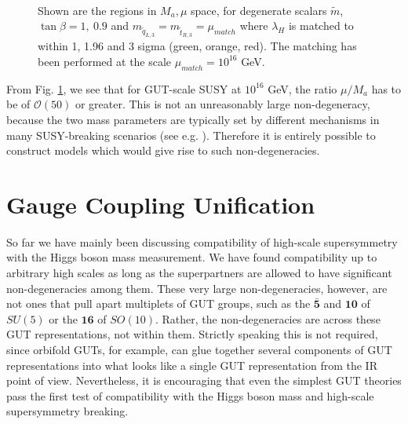 \documentclass[12pt]{article}
\newcommand{\Order}{\mathcal{O}}
\newcommand{\sq}{\tilde{q}}
\newcommand{\mStL}{m_{\sq_{L,3}}}
\newcommand{\mStR}{m_{\tilde{t}_{R,3}}}
\newcommand{\mS}{\tilde{m}}
\begin{document}
\begin{figure}[t]
\centering
{}~~
\caption{Shown are the regions in $M_a, \mu$ space, for degenerate scalars $\mS$, $\tan\beta=1,~0.9$ and $\mStL=\mStR=\mu_{match}$ where $\lambda_H$ is matched to within 1, 1.96 and 3 sigma (green, orange, red). The matching has been performed at the scale $\mu_{match}=10^{16}$ GeV.%
}
\label{16_contours.FIG}
\end{figure}

From Fig. \ref{16_contours.FIG}, we see that for GUT-scale SUSY at $10^{16}$ GeV, the ratio $\mu / M_a$ has to be of $\Order(50)$ or greater. This is not an unreasonably large non-degeneracy, because the two mass parameters are typically set by different mechanisms in many SUSY-breaking scenarios (see e.g. \cite{Giudice:1988yz, Witten:2001bf, Acharya:2006ia, Raby:2017ucc}). Therefore it is entirely possible to construct models which would give rise to such non-degeneracies.



\section{Gauge Coupling Unification}
\label{GCU.SEC}

So far we have mainly been discussing compatibility of high-scale supersymmetry with the Higgs boson mass measurement. We have found compatibility up to arbitrary high scales as long as the superpartners are allowed to have significant non-degeneracies among them. These very large non-degeneracies, however, are not ones that pull apart multiplets of GUT groups, such as the $\bar {\mathbf{5}}$ and $\mathbf{10}$ of $SU(5)$ or the $\mathbf{16}$ of $SO(10)$. Rather, the non-degeneracies are across these GUT representations, not within them. Strictly speaking this is not required, since orbifold GUTs, for example, can glue together several components of GUT representations into what looks like a single GUT representation from the IR point of view. Nevertheless, it is encouraging that even the simplest %
GUT theories pass the first test of compatibility with the Higgs boson mass and high-scale supersymmetry breaking.
\end{document}
